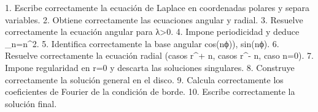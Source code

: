 1. Escribe correctamente la ecuación de Laplace en coordenadas polares y separa variables.				
2. Obtiene correctamente las ecuaciones angular y radial.				
3. Resuelve correctamente la ecuación angular para λ>0.				
4. Impone periodicidad y deduce \lambda_n=n^2.
5. Identifica correctamente la base angular cos⁡(nϕ)), sin⁡(nϕ).				
6. Resuelve correctamente la ecuación radial (casos r^{+ n}, casos r^{- n}, caso n=0).				
7. Impone regularidad en r=0 y descarta las soluciones singulares.
8. Construye correctamente la solución general en el disco.			
9. Calcula correctamente los coeficientes de Fourier de la condición de borde.				
10. Escribe correctamente la solución final.				
